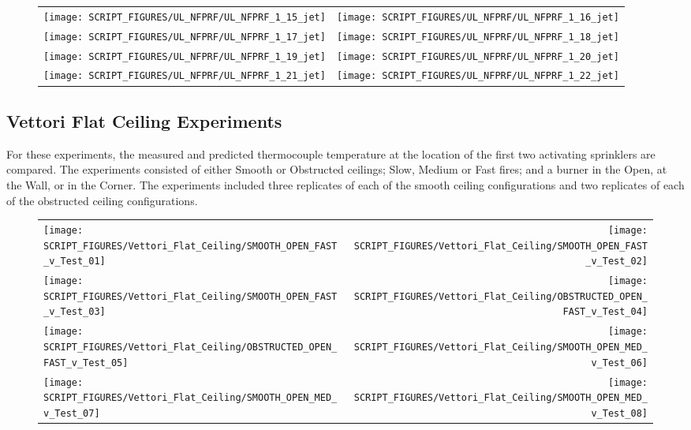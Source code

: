 \begin{figure}[p]
\begin{tabular*}{\textwidth}{l@{\extracolsep{\fill}}r}
\texttt{[image: SCRIPT\_FIGURES/UL\_NFPRF/UL\_NFPRF\_1\_15\_jet]} &
\texttt{[image: SCRIPT\_FIGURES/UL\_NFPRF/UL\_NFPRF\_1\_16\_jet]} \\
\texttt{[image: SCRIPT\_FIGURES/UL\_NFPRF/UL\_NFPRF\_1\_17\_jet]} &
\texttt{[image: SCRIPT\_FIGURES/UL\_NFPRF/UL\_NFPRF\_1\_18\_jet]} \\
\texttt{[image: SCRIPT\_FIGURES/UL\_NFPRF/UL\_NFPRF\_1\_19\_jet]} &
\texttt{[image: SCRIPT\_FIGURES/UL\_NFPRF/UL\_NFPRF\_1\_20\_jet]} \\
\texttt{[image: SCRIPT\_FIGURES/UL\_NFPRF/UL\_NFPRF\_1\_21\_jet]} &
\texttt{[image: SCRIPT\_FIGURES/UL\_NFPRF/UL\_NFPRF\_1\_22\_jet]}
\end{tabular*}
\label{UL_NFPRF_jet_3}
\end{figure}


\clearpage

\subsection{Vettori Flat Ceiling Experiments}
\label{Vettori_Flat_Results}

For these experiments, the measured and predicted thermocouple temperature at the location of the first two activating sprinklers are compared. The experiments consisted of either Smooth or Obstructed ceilings; Slow, Medium or Fast fires; and a burner in the Open, at the Wall, or in the Corner.
The experiments included three replicates of each of the smooth ceiling configurations and two replicates of each of the obstructed ceiling configurations.

\newpage

\begin{figure}[p]
\begin{tabular*}{\textwidth}{l@{\extracolsep{\fill}}r}
\texttt{[image: SCRIPT\_FIGURES/Vettori\_Flat\_Ceiling/SMOOTH\_OPEN\_FAST\_v\_Test\_01]} &
\texttt{[image: SCRIPT\_FIGURES/Vettori\_Flat\_Ceiling/SMOOTH\_OPEN\_FAST\_v\_Test\_02]} \\
\texttt{[image: SCRIPT\_FIGURES/Vettori\_Flat\_Ceiling/SMOOTH\_OPEN\_FAST\_v\_Test\_03]} &
\texttt{[image: SCRIPT\_FIGURES/Vettori\_Flat\_Ceiling/OBSTRUCTED\_OPEN\_FAST\_v\_Test\_04]} \\
\texttt{[image: SCRIPT\_FIGURES/Vettori\_Flat\_Ceiling/OBSTRUCTED\_OPEN\_FAST\_v\_Test\_05]} &
\texttt{[image: SCRIPT\_FIGURES/Vettori\_Flat\_Ceiling/SMOOTH\_OPEN\_MED\_v\_Test\_06]} \\
\texttt{[image: SCRIPT\_FIGURES/Vettori\_Flat\_Ceiling/SMOOTH\_OPEN\_MED\_v\_Test\_07]} &
\texttt{[image: SCRIPT\_FIGURES/Vettori\_Flat\_Ceiling/SMOOTH\_OPEN\_MED\_v\_Test\_08]} \\
\end{tabular*}
\label{Vettori_1}
\end{figure}

